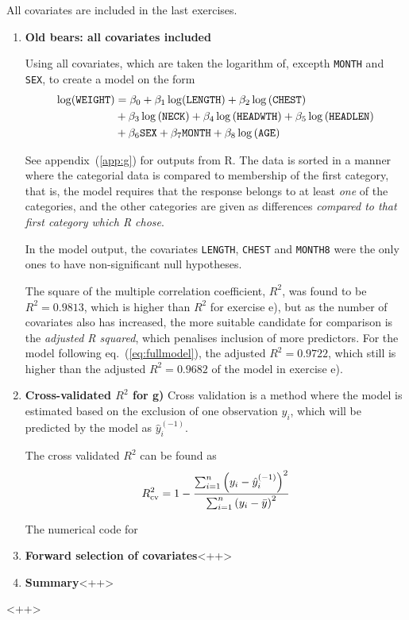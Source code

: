 \documentclass[a4paper,11pt]{article}
\begin{document}
All covariates are included in the last exercises.

\begin{enumerate}[resume*]
    \item \textbf{Old bears: all covariates included}

        Using all covariates, which are taken the logarithm of, excepth \texttt{MONTH} and \texttt{SEX}, to create a model on the form
\begin{align}
    \log(\mathtt{WEIGHT}) &= \beta_0 + \beta_1 \log(\mathtt{LENGTH}) + \beta_2 \log\left( \mathtt{CHEST} \right) \notag \\
    &+ \beta_3 \log \left( \mathtt{NECK} \right) + \beta_4 \log\left( \mathtt{HEADWTH} \right) + \beta_5 \log \left( \mathtt{HEADLEN} \right) \notag \\
    &+ \beta_6 \mathtt{SEX} + \beta_7 \mathtt{MONTH} + \beta_8 \log \left( \mathtt{AGE} \right)
    \label{eq:fullmodel}
\end{align}

See appendix~(\ref{app:g}) for outputs from R. The data is sorted in a manner where the categorial data is compared to membership of the first category, that is, the model requires that the response belongs to at least \textit{one} of the categories, and the other categories are given as differences \textit{compared to that first category which R chose}. 

In the model output, the covariates \texttt{LENGTH}, \texttt{CHEST} and \texttt{MONTH8} were the only ones to have non-significant null hypotheses. 

The square of the multiple  correlation coefficient, $R^2$, was found to be $R^2 = 0.9813$, which is higher than $R^2$ for exercise e), but as the number of covariates also has increased, the more suitable candidate for comparison is the \textit{adjusted R squared}, which penalises inclusion of more predictors. For the model following eq.~(\ref{eq:fullmodel}), the adjusted $R^2 = 0.9722$, which still is higher than the adjusted $R^2 = 0.9682$ of the model in exercise e). 

    \item \textbf{Cross-validated $R^2$ for g)}
        Cross validation is a method where the model is estimated based on the exclusion of one observation $y_i$, which will be predicted by the model as $\hat{y}_i^{(-1)}$. 

        The cross validated $R^2$ can be found as
        \begin{equation}
            R_{\rm cv}^2 = 1 - \frac{\sum_{i=1}^n \left( y_i - \hat{y}^{(-1)}_i \right)^2}{ \sum_{i=1}^n \left( y_i - \bar{y} \right)^2}
            \label{eq:rsquared_crossval}
        \end{equation}

        The numerical code for 



    \item \textbf{Forward selection of covariates}<++>

    \item \textbf{Summary}<++>
\end{enumerate}<++>
\end{document}
